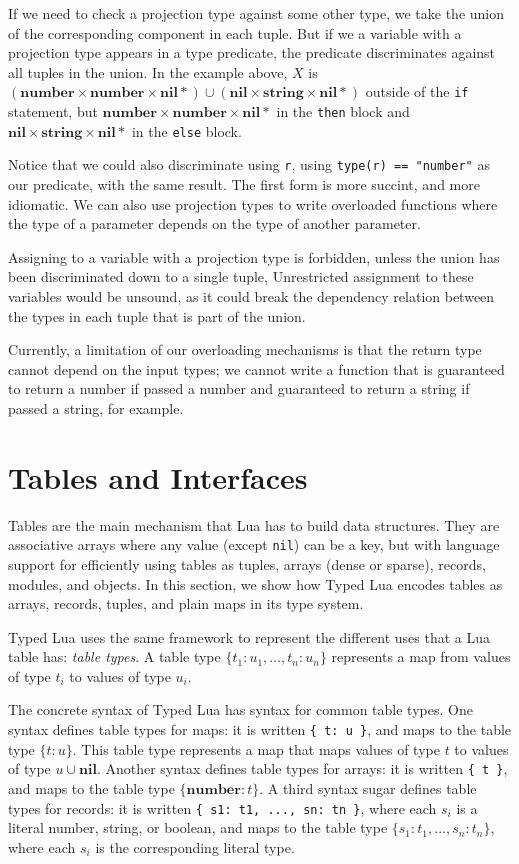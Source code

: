\documentclass[preprint]{sig-alternate}
\newcommand{\Nil}{\mathbf{nil}}
\newcommand{\Number}{\mathbf{number}}
\newcommand{\String}{\mathbf{string}}
\begin{document}
If we need to check a projection type
against some other type, we take the union of the corresponding
component in each tuple. But if we a variable with a projection
type appears in a type predicate, the predicate discriminates
against all tuples in the union. In the example above,
$X$ is $(\Number \times \Number \times \Nil *) \cup
(\Nil \times \String \times \Nil *)$ outside of the {\tt if}
statement, but $\Number \times \Number \times \Nil *$ in the
{\tt then} block and $\Nil \times \String \times \Nil *$ in
the {\tt else} block.

Notice that we could also discriminate using {\tt r}, using
{\tt type(r) == "number"} as our predicate, with the same
result. The first form is more succint, and more idiomatic.
We can also use projection types to write overloaded functions
where the type of a parameter depends on the type of another
parameter.

Assigning to a variable with a projection type is forbidden,
unless the union has been discriminated down to a single tuple,
Unrestricted assignment to these variables would be unsound,
as it could break the dependency relation between the types
in each tuple that is part of the union.

Currently, a limitation of our overloading mechanisms is that
the return type cannot depend on the input types; we cannot
write a function that is guaranteed to return a number if
passed a number and guaranteed to return a string if passed
a string, for example.

\section{Tables and Interfaces}
\label{sec:tables}

Tables are the main mechanism that Lua has to build data
structures. They are associative arrays where any value
(except {\tt nil}) can be a key, but with language support
for efficiently using tables as tuples, arrays (dense or sparse),
records, modules, and objects. In this section,
we show how Typed Lua encodes tables as arrays, records, tuples,
and plain maps in its type system.

Typed Lua uses the same framework to represent the different
uses that a Lua table has: {\em table types}. A table type
$\{ t_{1}:u_{1}, \ldots, t_{n}:u_{n}\}$ represents a map
from values of type $t_i$ to values of type $u_i$.

The concrete syntax of Typed Lua has syntax for
common table types. One syntax defines table types for
maps: it is written \texttt{\{ t: u \}},
and maps to the table type $\{t:u\}$.
This table type represents a map that maps values of type
$t$ to values of type $u \cup \Nil$.
Another syntax defines table types for arrays:
it is written \texttt{\{ t \}}, and maps to the table type
$\{\Number:t\}$. A third syntax sugar defines
table types for records:
it is written \texttt{\{ s1: t1, ..., sn: tn \}}, where
each $s_i$ is a literal number, string, or boolean, 
and maps to the table type $\{s_{1}:t_{1}, ..., s_{n}:t_{n}\}$,
where each $s_i$ is the corresponding literal type.
\end{document}
